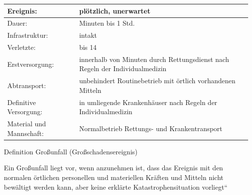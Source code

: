 \documentclass{article}
\begin{document}
\begin{center}
\begin{tabular}{|m{3.31cm}|m{9.99cm}|}
\hline
Ereignis:

 &
pl\"otzlich, unerwartet

\\\hline
Dauer:

 &
Minuten bis 1 Std.

\\\hline
Infrastruktur:

 &
intakt

\\\hline
Verletzte:

 &
bis 14

\\\hline
Erstversorgung:

 &
innerhalb von Minuten durch Rettungsdienst nach Regeln der
Individual\-medizin

\\\hline
Abtransport:

 &
unbehindert Routinebetrieb mit \"ortlich vorhandenen Mitteln

\\\hline
Definitive Versorgung:

 &
in umliegende Krankenh\"auser nach Regeln der Individualmedizin

\\\hline
Material und Mannschaft:

 &
Normalbetrieb Rettungs- und Krankentransport

\\\hline
\end{tabular}
\end{center}
Definition Gro{\ss}unfall
(Gro{\ss}schadensereignis)

{\quotedblbase}Ein Gro{\ss}unfall liegt vor, wenn anzunehmen ist, dass
das Ereignis mit den normalen \"ortlichen personellen und materiellen
Kr\"aften und Mitteln nicht bew\"altigt werden kann, aber keine
erkl\"arte Katastrophensituation vorliegt{\textquotedblleft}
\end{document}
